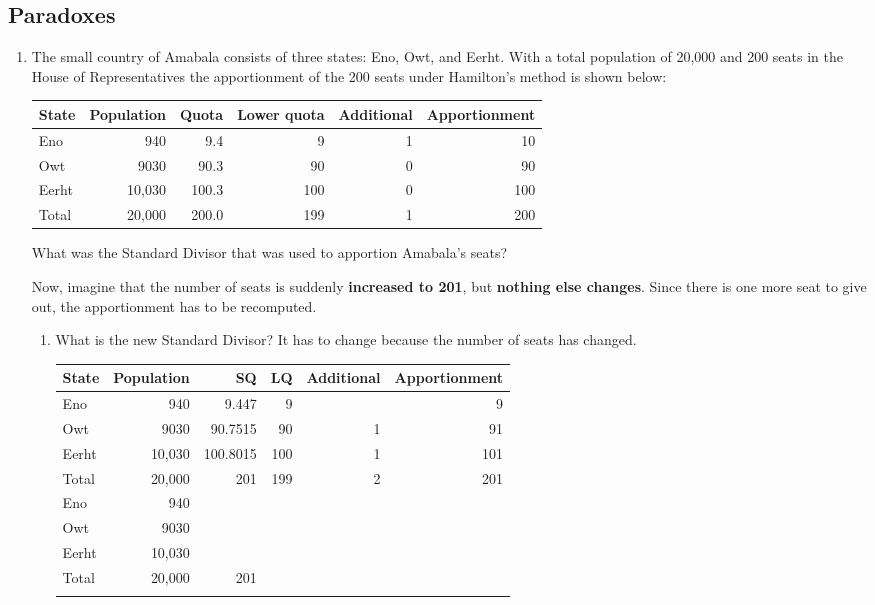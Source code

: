 \clearpage
\subsection{Paradoxes} 
\begin{enumerate}
	\item The small country of Amabala consists of three states: Eno, Owt, and Eerht.  With a total population of 20,000 and 200 seats in the House of Representatives the apportionment of the 200 seats under Hamilton's method is shown below:

	\begin{center}
		\begin{tabular}{lrrrrr} \hline
	State & Population & Quota & Lower quota & Additional & Apportionment \\\hline
	Eno & 940 & 9.4 & 9 & 1 & 10 \\\hline
	Owt & 9030 & 90.3 & 90 & 0 & 90 \\\hline
	Eerht & 10,030 & 100.3 & 100 & 0 & 100 \\\hline\hline
	Total & 20,000 & 200.0 & 199 & 1 & 200 \\\hline
	\end{tabular}
	\end{center}
	What was the Standard Divisor that was used to apportion Amabala's seats?  \fi\hrulefill
	
	Now, imagine that the number of seats is suddenly \textbf{increased to 201}, but \textbf{nothing else changes}.  Since there is one more seat to give out, the apportionment has to be recomputed.
	\begin{enumerate}
		\item What is the new Standard Divisor?  It has to change because the number of seats has changed.   \fi \hrulefill
	
	\begin{center}
	\large
		\begin{tabular}{l|r|r|r|r|r} \hline
	State & Population & SQ & LQ & Additional & Apportionment \\\hline
	\ifsolns
	Eno  & 940 & 9.447 & 9 &  & 9\\\hline 
Owt  & 9030 & 90.7515 & 90 & 1 & 91\\\hline 
Eerht  & 10,030 & 100.8015 & 100 & 1 & 101 \\\hline \hline
Total  & 20,000 & 201 & 199 & 2 & 201 \\\hline 
\else
	Eno & 940 &  &  &  &  \\\hline
	Owt & 9030 &  &  &  &  \\\hline
	Eerht & 10,030 &  &  &  &  \\\hline \hline
	Total & 20,000 & 201 &  &  &  \\\hline \fi
	\end{tabular}
	\normalsize
	\end{center}
	

\end{enumerate}
\end{enumerate}
